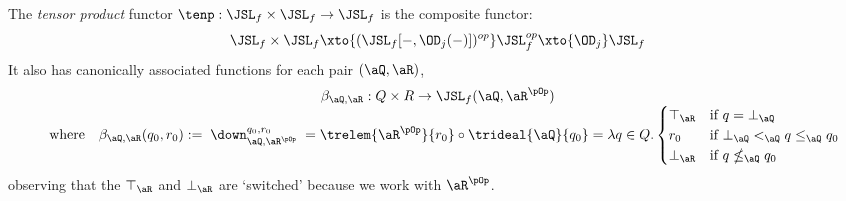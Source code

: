 \documentclass{article}
\begin{document}
\begin{definition}
\label{def:tenp}
\item
The \emph{tensor product} functor $\tenp : \JSL_f \times \JSL_f \to \JSL_f$ is the composite functor:
\[
\JSL_f \times \JSL_f \xto{(\JSL_f[-,\OD_j(-)])^{op}} \JSL_f^{op} \xto{\OD_j} \JSL_f
\]
It also has canonically associated functions for each pair $(\aQ,\aR)$,
\[
\begin{tabular}{c}
$\beta_{\aQ,\aR} : Q \times R \to \JSL_f(\aQ,\aR^{\pOp})$
\\
$\quad\text{where}\quad
\beta_{\aQ,\aR}(q_0,r_0) 
:= \; \down_{\aQ,\aR^{\pOp}}^{q_0,r_0} \; 
= \trelem{\aR^{\pOp}}{r_0} \circ \trideal{\aQ}{q_0}
= \lambda q \in Q.
\begin{cases} 
\top_\aR & \text{if $q = \bot_\aQ$}
\\
r_0 & \text{if $\bot_\aQ <_\aQ q \leq_\aQ q_0$}
\\
\bot_\aR & \text{if $q \nleq_\aQ q_0$}
\end{cases}$
\end{tabular}
\]
observing that the $\top_\aR$ and $\bot_\aR$ are `switched' because we work with $\aR^{\pOp}$. \endbox
\end{definition}
\end{document}
